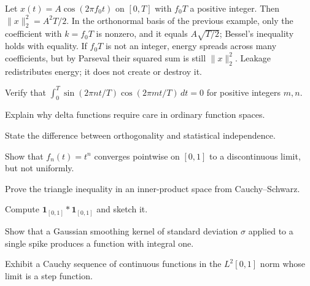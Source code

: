 \begin{workedexample}
Let $x(t)=A\cos(2\pi f_0t)$ on $[0,T]$ with $f_0T$ a positive integer. Then $\|x\|_2^2=A^2T/2$. In the orthonormal basis of the previous example, only the coefficient with $k=f_0T$ is nonzero, and it equals $A\sqrt{T/2}$; Bessel's inequality holds with equality. If $f_0T$ is not an integer, energy spreads across many coefficients, but by Parseval their squared sum is still $\|x\|_2^2$. Leakage redistributes energy; it does not create or destroy it.
\end{workedexample}
\begin{exercises}
\item Verify that $\int_0^T\sin(2\pi nt/T)\cos(2\pi mt/T)\,dt=0$ for positive integers $m,n$.
\item Explain why delta functions require care in ordinary function spaces.
\item State the difference between orthogonality and statistical independence.
\item Show that $f_n(t)=t^n$ converges pointwise on $[0,1]$ to a discontinuous limit, but not uniformly.
\item Prove the triangle inequality in an inner-product space from Cauchy--Schwarz.
\item Compute $\mathbf 1_{[0,1]}\ast\mathbf 1_{[0,1]}$ and sketch it.
\item Show that a Gaussian smoothing kernel of standard deviation $\sigma$ applied to a single spike produces a function with integral one.
\item Exhibit a Cauchy sequence of continuous functions in the $L^2[0,1]$ norm whose limit is a step function.
\end{exercises}
